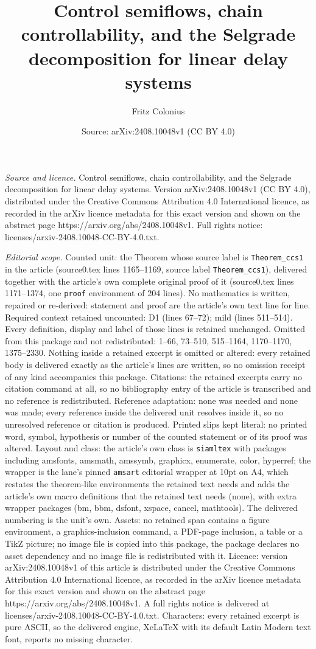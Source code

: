 \documentclass[10pt,a4paper]{amsart}
\title[Control semiflows, chain controllability, and the Selgrade d]{Control semiflows, chain controllability, and the Selgrade decomposition for linear delay systems}
\author{Fritz Colonius}
\date{Source: arXiv:2408.10048v1 (CC BY 4.0)}
\begin{document}
\maketitle

\noindent\emph{Source and licence.} Control semiflows, chain controllability, and the Selgrade decomposition for linear delay systems. Version arXiv:2408.10048v1 (CC BY 4.0), distributed under the Creative Commons Attribution 4.0 International licence, as recorded in the arXiv licence metadata for this exact version and shown on the abstract page https://arxiv.org/abs/2408.10048v1. Full rights notice: licenses/arxiv-2408.10048-CC-BY-4.0.txt.\par\smallskip

\noindent\textit{Editorial scope.} Counted unit: the Theorem whose source label is \texttt{Theorem\_ccs1} in the article (source0.tex lines 1165--1169, source label \texttt{Theorem\_ccs1}), delivered together with the article's own complete original proof of it (source0.tex lines 1171--1374, one \texttt{proof} environment of 204 lines). No mathematics is written, repaired or re-derived: statement and proof are the article's own text line for line. Required context retained uncounted: D1 (lines 67--72); mild (lines 511--514). Every definition, display and label of those lines is retained unchanged. Omitted from this package and not redistributed: 1--66, 73--510, 515--1164, 1170--1170, 1375--2330. Nothing inside a retained excerpt is omitted or altered: every retained body is delivered exactly as the article's lines are written, so no omission receipt of any kind accompanies this package. Citations: the retained excerpts carry no citation command at all, so no bibliography entry of the article is transcribed and no reference is redistributed. Reference adaptation: none was needed and none was made; every reference inside the delivered unit resolves inside it, so no unresolved reference or citation is produced. Printed slips kept literal: no printed word, symbol, hypothesis or number of the counted statement or of its proof was altered. Layout and class: the article's own class is \texttt{siamltex} with packages including amsfonts, amsmath, amssymb, graphicx, enumerate, color, hyperref; the wrapper is the lane's pinned \texttt{amsart} editorial wrapper at 10pt on A4, which restates the theorem-like environments the retained text needs and adds the article's own macro definitions that the retained text needs (none), with extra wrapper packages (bm, bbm, dsfont, xspace, cancel, mathtools). The delivered numbering is the unit's own. Assets: no retained span contains a figure environment, a graphics-inclusion command, a PDF-page inclusion, a table or a TikZ picture; no image file is copied into this package, the package declares no asset dependency and no image file is redistributed with it. Licence: version arXiv:2408.10048v1 of this article is distributed under the Creative Commons Attribution 4.0 International licence, as recorded in the arXiv licence metadata for this exact version and shown on the abstract page https://arxiv.org/abs/2408.10048v1. A full rights notice is delivered at licenses/arxiv-2408.10048-CC-BY-4.0.txt. Characters: every retained excerpt is pure ASCII, so the delivered engine, XeLaTeX with its default Latin Modern text font, reports no missing character.
\end{document}
